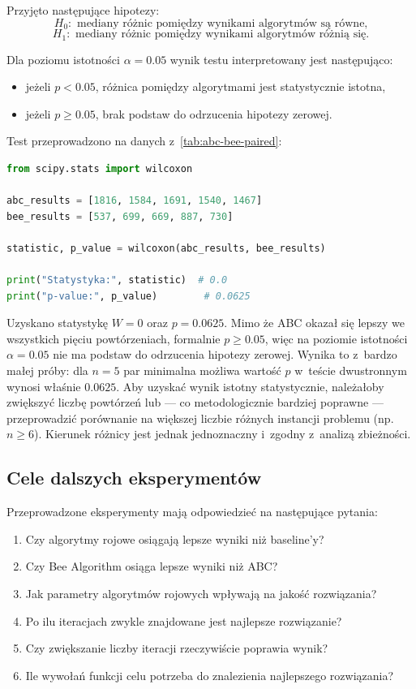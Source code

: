 Przyjęto następujące hipotezy:
\[
    H_0:
    \text{ mediany różnic pomiędzy wynikami algorytmów są równe,}
\]
\[
    H_1:
    \text{ mediany różnic pomiędzy wynikami algorytmów różnią się.}
\]

Dla poziomu istotności $\alpha = 0.05$ wynik testu interpretowany jest następująco:
\begin{itemize}
    \item jeżeli $p < 0.05$, różnica pomiędzy algorytmami jest statystycznie istotna,
    \item jeżeli $p \geq 0.05$, brak podstaw do odrzucenia hipotezy zerowej.
\end{itemize}

Test przeprowadzono na danych z~\cref{tab:abc-bee-paired}:

\begin{lstlisting}[language=Python, caption={Test Wilcoxona na zebranych wynikach}]
from scipy.stats import wilcoxon

abc_results = [1816, 1584, 1691, 1540, 1467]
bee_results = [537, 699, 669, 887, 730]

statistic, p_value = wilcoxon(abc_results, bee_results)

print("Statystyka:", statistic)  # 0.0
print("p-value:", p_value)        # 0.0625
\end{lstlisting}

Uzyskano statystykę $W = 0$ oraz $p = 0.0625$. Mimo że ABC okazał się lepszy
we wszystkich pięciu powtórzeniach, formalnie $p \geq 0.05$, więc na poziomie
istotności $\alpha = 0.05$ nie ma podstaw do odrzucenia hipotezy zerowej. Wynika
to z~bardzo małej próby: dla $n = 5$ par minimalna możliwa wartość $p$ w~teście
dwustronnym wynosi właśnie $0.0625$. Aby uzyskać wynik istotny statystycznie,
należałoby zwiększyć liczbę powtórzeń lub --- co metodologicznie bardziej
poprawne --- przeprowadzić porównanie na większej liczbie różnych instancji
problemu (np.\ $n \geq 6$). Kierunek różnicy jest jednak jednoznaczny i~zgodny
z~analizą zbieżności.

\subsection{Cele dalszych eksperymentów}

Przeprowadzone eksperymenty mają odpowiedzieć na następujące pytania:
\begin{enumerate}
    \item Czy algorytmy rojowe osiągają lepsze wyniki niż baseline'y?
    \item Czy Bee Algorithm osiąga lepsze wyniki niż ABC?
    \item Jak parametry algorytmów rojowych wpływają na jakość rozwiązania?
    \item Po ilu iteracjach zwykle znajdowane jest najlepsze rozwiązanie?
    \item Czy zwiększanie liczby iteracji rzeczywiście poprawia wynik?
    \item Ile wywołań funkcji celu potrzeba do znalezienia najlepszego rozwiązania?
\end{enumerate}

